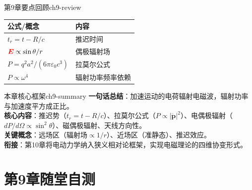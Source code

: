 \documentclass[11pt,a4paper,openany,oneside]{book}
\newcommand{\vecE}{\textcolor{red}{\vect{E}}}
\newcommand{\eps}{\varepsilon}
\newcommand{\vect}[1]{\bm{#1}}
\begin{document}
\begin{review}{第9章要点回顾}{ch9-review}
\begin{center}
\begin{tabular}{@{}ll@{}}
\toprule
\textbf{公式/概念} & \textbf{内容} \\
\midrule
$t_r = t - R/c$ & 推迟时间 \\
$\vecE \propto \sin\theta/r$ & 偶极辐射场 \\
$P = q^2a^2/(6\pi\eps_0c^3)$ & 拉莫尔公式 \\
$P \propto \omega^4$ & 辐射功率频率依赖 \\
\bottomrule
\end{tabular}
\end{center}
\end{review}

\begin{tip}{本章核心框架}{ch9-summary}
\textbf{一句话总结}：加速运动的电荷辐射电磁波，辐射功率与加速度平方成正比。\\
\textbf{核心内容}：推迟势（$t_r=t-R/c$）、拉莫尔公式（$P\propto|\ddot{\vect{p}}|^2$）、电偶极辐射（$dP/d\Omega\propto\sin^2\theta$）、磁偶极辐射、天线方向性。\\
\textbf{关键概念}：远场区（辐射场$\propto 1/r$）、近场区（准静态）、推迟效应。\\
\textbf{衔接}：第10章将电动力学纳入狭义相对论框架，实现电磁理论的四维协变形式。
\end{tip}

\section*{第9章随堂自测}
\end{document}
